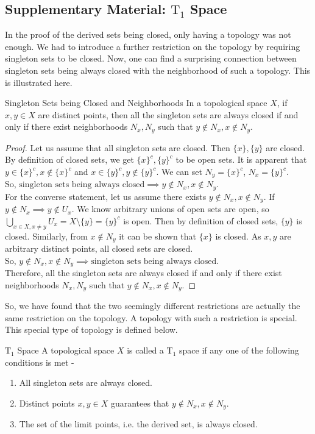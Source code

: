 \subsection{Supplementary Material: \texorpdfstring{$\mathrm{T}_1$}{T1} Space}
In the proof of the derived sets being closed, only having a topology was not enough. We had to introduce a further restriction on the topology by requiring singleton sets to be closed. Now, one can find a surprising connection between singleton sets being always closed with the neighborhood of such a topology. This is illustrated here.
\begin{Theorem}{Singleton Sets being Closed and Neighborhoods}\label{singleton_set_closed_disjoint_neighborhood}
    In a topological space $X$, if $x,y\in X$ are distinct points, then all the singleton sets are always closed if and only if there exist neighborhoods $N_x, N_y$ such that $y\notin N_x, x\notin N_y$.
\end{Theorem}
\begin{proof}
    Let us assume that all singleton sets are closed. Then $\{x\},\{y\}$ are closed. By definition of closed sets, we get $\{x\}^c,\{y\}^c$ to be open sets. It is apparent that $y\in\{x\}^c,x\notin\{x\}^c$ and $x\in\{y\}^c,y\notin\{y\}^c$. We can set $N_y=\{x\}^c$, $N_x=\{y\}^c$.\\ So, $\boxed{\text{singleton sets being always closed}\implies y\notin N_x,x\notin N_y}$.\\ For the converse statement, let us assume there exists $y\notin N_x,x\notin N_y$. If $y\notin N_x\implies y\notin U_x$. We know arbitrary unions of open sets are open, so $\bigcup_{x\in X,x\neq y}U_x=X\setminus\{y\}=\{y\}^c$ is open. Then by definition of closed sets, $\{y\}$ is closed. Similarly, from $x\notin N_y$ it can be shown that $\{x\}$ is closed. As $x, y$ are arbitrary distinct points, all closed sets are closed.\\
    So, $\boxed{y\notin N_x,x\notin N_y\implies\text{singleton sets being always closed}}$.\\
    Therefore, all the singleton sets are always closed if and only if there exist neighborhoods $N_x, N_y$ such that $y\notin N_x, x\notin N_y$.
\end{proof}
\noindent So, we have found that the two seemingly different restrictions are actually the same restriction on the topology. A topology with such a restriction is special. This special type of topology is defined below.
\begin{Definition}{$\mathrm{T}_1$ Space}\label{T_1_space}
    A topological space $X$ is called a $\mathrm{T}_1$ space if any one of the following conditions is met -
    \begin{enumerate}
        \item All singleton sets are always closed.
        \item Distinct points $x,y\in X$ guarantees that $y\notin N_x, x\notin N_y$.
        \item The set of the limit points, i.e. the derived set, is always closed.
    \end{enumerate}
\end{Definition}
